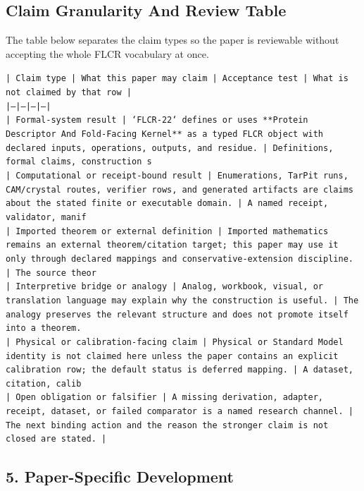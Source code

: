\documentclass[11pt]{article}
\begin{document}
\subsection*{Claim Granularity And Review Table}

The table below separates the claim types so the paper is reviewable without accepting the whole FLCR vocabulary at once.

\noindent\texttt{| Claim type | What this paper may claim | Acceptance test | What is not claimed by that row |}\\
\noindent\texttt{|---|---|---|---|}\\
\noindent\texttt{| Formal-system result | `FLCR-22` defines or uses **Protein Descriptor And Fold-Facing Kernel** as a typed FLCR object with declared inputs, operations, outputs, and residue. | Definitions, formal claims, construction s}\\
\noindent\texttt{| Computational or receipt-bound result | Enumerations, TarPit runs, CAM/crystal routes, verifier rows, and generated artifacts are claims about the stated finite or executable domain. | A named receipt, validator, manif}\\
\noindent\texttt{| Imported theorem or external definition | Imported mathematics remains an external theorem/citation target; this paper may use it only through declared mappings and conservative-extension discipline. | The source theor}\\
\noindent\texttt{| Interpretive bridge or analogy | Analog, workbook, visual, or translation language may explain why the construction is useful. | The analogy preserves the relevant structure and does not promote itself into a theorem. }\\
\noindent\texttt{| Physical or calibration-facing claim | Physical or Standard Model identity is not claimed here unless the paper contains an explicit calibration row; the default status is deferred mapping. | A dataset, citation, calib}\\
\noindent\texttt{| Open obligation or falsifier | A missing derivation, adapter, receipt, dataset, or failed comparator is a named research channel. | The next binding action and the reason the stronger claim is not closed are stated. | }\\

\subsection*{5. Paper-Specific Development}
\end{document}
